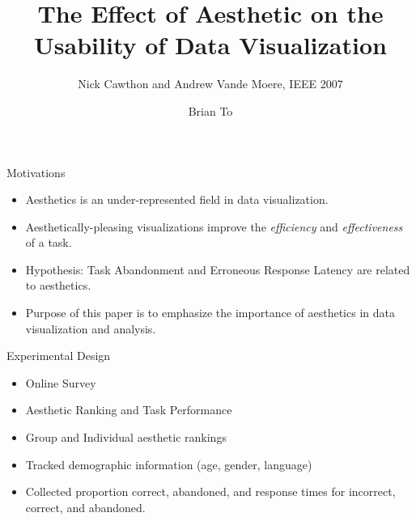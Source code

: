 \documentclass[12pt]{beamer}
\title{The Effect of Aesthetic on the Usability of Data Visualization}
\subtitle{Nick Cawthon and Andrew Vande Moere, IEEE 2007}
\author{Brian To}
\begin{document}
  \maketitle

  \begin{frame}{Motivations}
    \begin{itemize}
      \item Aesthetics is an under-represented field in data visualization.
      \item Aesthetically-pleasing visualizations improve the \emph{efficiency}
            and \emph{effectiveness} of a task.
      \item Hypothesis: Task Abandonment and Erroneous Response Latency are
            related to aesthetics.
      \item Purpose of this paper is to emphasize the importance of aesthetics
            in data visualization and analysis.
    \end{itemize}
  \end{frame}

  \begin{frame}{Experimental Design}
    \begin{itemize}
      \item Online Survey
      \item Aesthetic Ranking and Task Performance
      \item Group and Individual aesthetic rankings
      \item Tracked demographic information (age, gender, language)
      \item Collected proportion correct, abandoned, and response times for
            incorrect, correct, and abandoned.
    \end{itemize}
  \end{frame}
      
\end{document}
